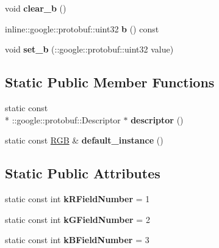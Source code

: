 \begin{DoxyCompactItemize}
\item 
\hypertarget{classvss__state_1_1RGB_a3b8c5f9250f44c8d0f987bcf10abdc64}{void {\bfseries clear\-\_\-b} ()}\label{classvss__state_1_1RGB_a3b8c5f9250f44c8d0f987bcf10abdc64}

\item 
\hypertarget{classvss__state_1_1RGB_ac59c6fa5dafec18a115e3a00cd1fa68e}{inline\-::google\-::protobuf\-::uint32 {\bfseries b} () const }\label{classvss__state_1_1RGB_ac59c6fa5dafec18a115e3a00cd1fa68e}

\item 
\hypertarget{classvss__state_1_1RGB_a3977bb063a529efca387875a69a5b465}{void {\bfseries set\-\_\-b} (\-::google\-::protobuf\-::uint32 value)}\label{classvss__state_1_1RGB_a3977bb063a529efca387875a69a5b465}

\end{DoxyCompactItemize}
\subsection*{Static Public Member Functions}
\begin{DoxyCompactItemize}
\item 
\hypertarget{classvss__state_1_1RGB_a64df354aa51e9fb966ee23e03a5e9329}{static const \\*
\-::google\-::protobuf\-::\-Descriptor $\ast$ {\bfseries descriptor} ()}\label{classvss__state_1_1RGB_a64df354aa51e9fb966ee23e03a5e9329}

\item 
\hypertarget{classvss__state_1_1RGB_a82e155d80791f80c397423d539f03614}{static const \hyperlink{classvss__state_1_1RGB}{R\-G\-B} \& {\bfseries default\-\_\-instance} ()}\label{classvss__state_1_1RGB_a82e155d80791f80c397423d539f03614}

\end{DoxyCompactItemize}
\subsection*{Static Public Attributes}
\begin{DoxyCompactItemize}
\item 
\hypertarget{classvss__state_1_1RGB_a6b14019e7583f983a0dc0e0c713767e5}{static const int {\bfseries k\-R\-Field\-Number} = 1}\label{classvss__state_1_1RGB_a6b14019e7583f983a0dc0e0c713767e5}

\item 
\hypertarget{classvss__state_1_1RGB_a7f4f93a87024582ed9aa94ad501aacc0}{static const int {\bfseries k\-G\-Field\-Number} = 2}\label{classvss__state_1_1RGB_a7f4f93a87024582ed9aa94ad501aacc0}

\item 
\hypertarget{classvss__state_1_1RGB_a2c4583771ba2ee5b0f6798c7ee082b3e}{static const int {\bfseries k\-B\-Field\-Number} = 3}\label{classvss__state_1_1RGB_a2c4583771ba2ee5b0f6798c7ee082b3e}

\end{DoxyCompactItemize}
